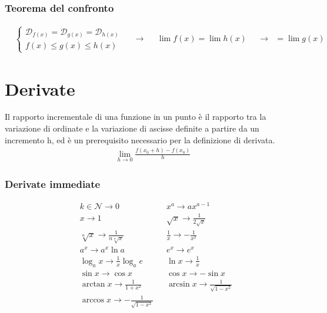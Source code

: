 \documentclass[a4paper]{article}
\begin{document}
	\subsubsection{Teorema del confronto}
	\begin{align*}
	&\begin{cases}
			\mathcal{D}_{f(x)} = \mathcal{D}_{g(x)} = \mathcal{D}_{h(x)}\\
			f(x) \le g(x) \le h(x)
		\end{cases}	&	&\to	&	&\lim f(x) = \lim h(x)	&	&\to	&=\lim g(x)
	\end{align*}
	
	
	\newpage
	\section{Derivate}
	Il rapporto incrementale di una funzione in un punto è il rapporto tra la variazione di ordinate e la variazione di ascisse definite a partire da un incremento h, ed è un prerequisito necessario per la definizione di derivata.
	\begin{align*}
		\lim\limits_{h \to 0}{\frac{f(x_0 + h) - f(x_0) }{h}}
	\end{align*}
	
	\subsubsection{Derivate immediate}
	\begin{align*}
		&k \in \mathcal{N}  \to 0                       & &x^a          \to	 ax^{a-1}              \\
		&x                  \to 1                       & &\sqrt{x}     \to 	\frac{1}{2\sqrt{x}}   \\
		&\sqrt[n]{x}        \to \frac{1}{n\sqrt[n]{x}}  & &\frac{1}{x}  \to -\frac{1}{x^2}         \\
		&a^x                \to a^x\ln a                & &e^x          \to e^x                    \\
		&\log_{a} x         \to \frac{1}{x} \log_{a} e  & &\ln x        \to \frac{1}{x}            \\
		&\sin x             \to \cos x                  & &\cos x       \to -\sin x                \\
		&\arctan x          \to \frac{1}{1+x^2}         & &\arcsin x    \to \frac{1}{\sqrt{1-x^2}} \\
		&\arccos x          \to -\frac{1}{\sqrt{1-x^2}} &\\
	\end{align*}
	
\end{document}
